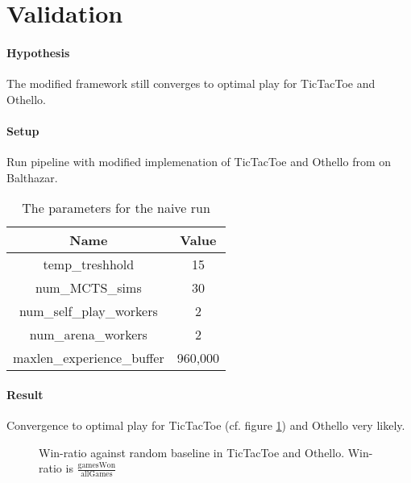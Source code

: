 \section{Validation}
\paragraph{Hypothesis} The modified framework still converges to optimal play for TicTacToe and Othello.
\paragraph{Setup} Run pipeline with modified implemenation of TicTacToe and Othello from \cite{thakoor_suragnairalpha-zero-general_nodate} on Balthazar.

\begin{table}[!h]
    \begin{center}
        \begin{tabular}{ c|c }
            Name                       & Value   \\
            \hline
            \hline
            temp\_treshhold            & 15      \\
            num\_MCTS\_sims            & 30      \\
            num\_self\_play\_workers   & 2       \\
            num\_arena\_workers        & 2       \\
            maxlen\_experience\_buffer & 960,000 \\
        \end{tabular}
    \end{center}
    \caption{The parameters for the naive run}
\end{table}

\paragraph{Result} Convergence to optimal play for TicTacToe (cf. figure \ref{tictactoe_performance}) and Othello very likely.

\begin{figure}[!h]
    \centering
    \hfill
    \caption{Win-ratio against random baseline in TicTacToe and Othello. Win-ratio is $\frac{\text{gamesWon}}{\text{allGames}}$ }
    \label{tictactoe_performance}
\end{figure}

